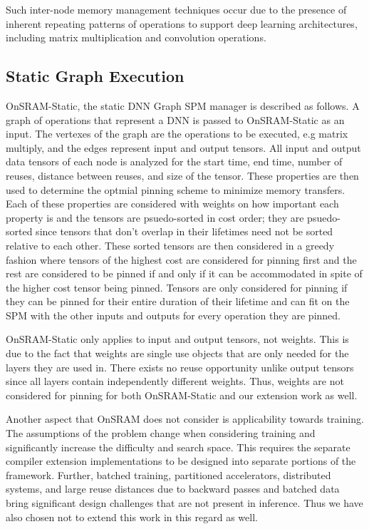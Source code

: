Such inter-node memory management techniques occur due to the presence of
inherent repeating patterns of operations to support deep learning
architectures, including matrix multiplication and convolution operations.



\subsection{Static Graph Execution}

OnSRAM-Static, the static DNN Graph SPM manager is described as follows. A
graph of operations that represent a DNN is passed to OnSRAM-Static as an
input. The vertexes of the graph are the operations to be executed, e.g matrix
multiply, and the edges represent input and output tensors.  All input and
output data tensors of each node is analyzed for the start time, end time,
number of reuses, distance between reuses, and size of the tensor. These
properties are then used to determine the optmial pinning scheme to minimize
memory transfers. Each of these properties are considered with weights on how
important each property is and the tensors are psuedo-sorted in cost order;
they are psuedo-sorted since tensors that don't overlap in their lifetimes need
not be sorted relative to each other. These sorted tensors are then considered
in a greedy fashion where tensors of the highest cost are considered for
pinning first and the rest are considered to be pinned if and only if it can be
accommodated in spite of the higher cost tensor being pinned. Tensors are only
considered for pinning if they can be pinned for their entire duration of their
lifetime and can fit on the SPM with the other inputs and outputs for every
operation they are pinned.

OnSRAM-Static only applies to input and output tensors, not weights. This is
due to the fact that weights are single use objects that are only needed for
the layers they are used in. There exists no reuse opportunity unlike output
tensors since all layers contain independently different weights. Thus, weights
are not considered for pinning for both OnSRAM-Static and our extension work as
well.

Another aspect that OnSRAM does not consider is applicability towards training.
The assumptions of the problem change when considering training and
significantly increase the difficulty and search space. This requires the
separate compiler extension implementations to be designed into separate
portions of the framework. Further, batched training, partitioned accelerators,
distributed systems, and large reuse distances due to backward passes and
batched data \cite{onsram} bring significant design challenges that are not present in
inference. Thus we have also chosen not to extend this work in this regard as
well.

